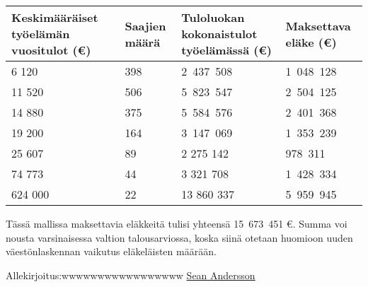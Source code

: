 \documentclass{article}
\begin{document}
	\vspace{12pt}
		\begin{table}[htbp]
		\centering
		\begin{tabularx}{\textwidth}{|X|X|X|X|}
			\hline
			Keskimääräiset työelämän vuositulot (€) & Saajien määrä & Tuloluokan kokonaistulot työelämässä (€) & Maksettava eläke (€)\\
			\hline
			6 120 & 398 & 2 437 508 & 1 048 128\\
			\hline
			11 520 & 506 & 5 823 547 & 2 504 125\\
			\hline
			14 880 & 375 & 5 584 576 & 2 401 368\\
			\hline
			19 200 & 164 & 3 147 069 & 1 353 239\\
			\hline
			25 607 & 89 & 2 275 142 & 978 311\\
			\hline
			74 773 & 44 & 3 321 708 & 1 428 334\\
			\hline
			624 000 & 22 & 13 860 337 & 5 959 945\\
			\hline
		\end{tabularx}
	\end{table}

	\vspace{12pt}
	Tässä mallissa maksettavia eläkkeitä tulisi yhteensä 15 673 451 €. Summa voi nousta varsinaisessa valtion talousarviossa, koska siinä otetaan huomioon uuden väestönlaskennan vaikutus eläkeläisten määrään.
	
	\vspace{12pt}
	Allekirjoitus:wwwwwwwwwwwwwwwww
	\underline{Sean Andersson}
	
	
\end{document}
